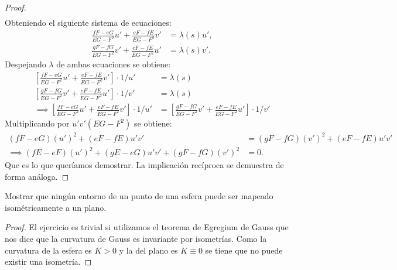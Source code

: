 \documentclass{article}
\newenvironment{theorem}[2][Ejercicio]{\begin{trivlist}
\item[\hskip \labelsep {\bfseries #1}\hskip \labelsep {\bfseries #2.}]}{\end{trivlist}}
\begin{document}
\begin{proof}
\begin{align*}
    \end{align*}
    Obteniendo el siguiente sistema de ecuaciones: \begin{align*}
        \frac{fF - eG}{EG - F^2} u' + \frac{eF - fE}{EG - F^2} v' & = \lambda(s) u', \\
        \frac{gF - fG}{EG - F^2} v' + \frac{eF - fE}{EG - F^2} u' & = \lambda(s) v'.
    \end{align*}
    Despejando \( \lambda \) de ambas ecuaciones se obtiene: \begin{align*}
        \left [ \frac{fF - eG}{EG - F^2} u' + \frac{eF - fE}{EG - F^2} v' \right] \cdot 1/u'          & = \lambda(s)                                                                           \\
        \left [ \frac{gF - fG}{EG - F^2} v' + \frac{eF - fE}{EG - F^2} u' \right] \cdot 1/v'          & = \lambda(s)                                                                           \\
        \implies \left [ \frac{fF - eG}{EG - F^2} u' + \frac{eF - fE}{EG - F^2} v' \right] \cdot 1/u' & = \left [ \frac{gF - fG}{EG - F^2} v' + \frac{eF - fE}{EG - F^2} u' \right] \cdot 1/v'
    \end{align*}
    Multiplicando por \( u'v'(EG - F^2) \) se obtiene: \begin{align*}
        (fF - eG) {(u')}^2 + (eF - fE) u'v'                               & = (gF - fG) {(v')}^2 + (eF - fE) u'v' \\
        \implies (fE - eF) {(u')}^2 + (gE - eG) u'v' + (gF - fG) {(v')}^2 & = 0.
    \end{align*}
    Que es lo que queríamos demostrar. La implicación recíproca se demuestra de forma análoga.
\end{proof}

\vspace{1em}

\begin{theorem}{10}
    Mostrar que ningún entorno de un punto de una esfera puede ser mapeado isométricamente a un plano.
\end{theorem}

\begin{proof}
    El ejercicio es trivial si utilizamos el teorema de Egregium de Gauss que nos dice que la curvatura de Gauss es invariante por isometrías. Como la curvatura de la esfera es \( K > 0 \) y la del plano es \( K \equiv 0 \) se tiene que no puede existir una isometría.
\end{proof}
\end{document}
